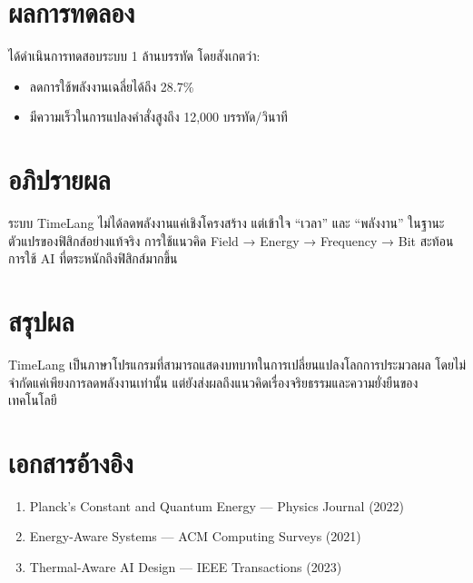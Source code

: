 \documentclass[12pt]{article}
\begin{document}
\section{ผลการทดลอง}
ได้ดำเนินการทดสอบระบบ 1 ล้านบรรทัด โดยสังเกตว่า:
\begin{itemize}
\item ลดการใช้พลังงานเฉลี่ยได้ถึง 28.7\%
\item มีความเร็วในการแปลงคำสั่งสูงถึง 12,000 บรรทัด/วินาที
\end{itemize}

\section{อภิปรายผล}
ระบบ TimeLang ไม่ได้ลดพลังงานแค่เชิงโครงสร้าง แต่เข้าใจ “เวลา” และ “พลังงาน” ในฐานะตัวแปรของฟิสิกส์อย่างแท้จริง การใช้แนวคิด Field → Energy → Frequency → Bit สะท้อนการใช้ AI ที่ตระหนักถึงฟิสิกส์มากขึ้น

\section{สรุปผล}
TimeLang เป็นภาษาโปรแกรมที่สามารถแสดงบทบาทในการเปลี่ยนแปลงโลกการประมวลผล โดยไม่จำกัดแค่เพียงการลดพลังงานเท่านั้น แต่ยังส่งผลถึงแนวคิดเรื่องจริยธรรมและความยั่งยืนของเทคโนโลยี

\section*{เอกสารอ้างอิง}
\begin{enumerate}
\item Planck's Constant and Quantum Energy — Physics Journal (2022)
\item Energy-Aware Systems — ACM Computing Surveys (2021)
\item Thermal-Aware AI Design — IEEE Transactions (2023)
\end{enumerate}
\end{document}
